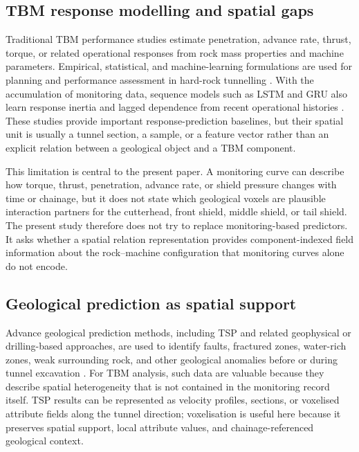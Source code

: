 \label{sec:related_work}

\subsection{TBM response modelling and spatial gaps}
Traditional TBM performance studies estimate penetration, advance rate,
thrust, torque, or related operational responses from rock mass properties and
machine parameters. Empirical, statistical, and machine-learning formulations
are used for planning and performance assessment in hard-rock tunnelling
\citep{yagiz2008utilizing,hassanpour2010tbm,armaghani2018prediction}. With the
accumulation of monitoring data, sequence models such as LSTM and GRU also
learn response inertia and lagged dependence from recent operational histories
\citep{hochreiter1997long,cho2014learning}. These studies provide important
response-prediction baselines, but their spatial unit is usually a tunnel
section, a sample, or a feature vector rather than an explicit relation between
a geological object and a TBM component.

This limitation is central to the present paper. A monitoring curve can
describe how torque, thrust, penetration, advance rate, or shield pressure
changes with time or chainage, but it does not state which geological voxels
are plausible interaction partners for the cutterhead, front shield, middle
shield, or tail shield. The present study therefore does not try to replace
monitoring-based predictors. It asks whether a spatial relation representation
provides component-indexed field information about the rock--machine
configuration that monitoring curves alone do not encode.

\subsection{Geological prediction as spatial support}
Advance geological prediction methods, including TSP and related geophysical
or drilling-based approaches, are used to identify faults, fractured zones,
water-rich zones, weak surrounding rock, and other geological anomalies before
or during tunnel excavation \citep{li2019tunnel}. For TBM analysis, such data
are valuable because they describe spatial heterogeneity that is not contained
in the monitoring record itself. TSP results can be represented as velocity
profiles, sections, or voxelised attribute fields along the tunnel direction;
voxelisation is useful here because it preserves spatial support, local
attribute values, and chainage-referenced geological context.

